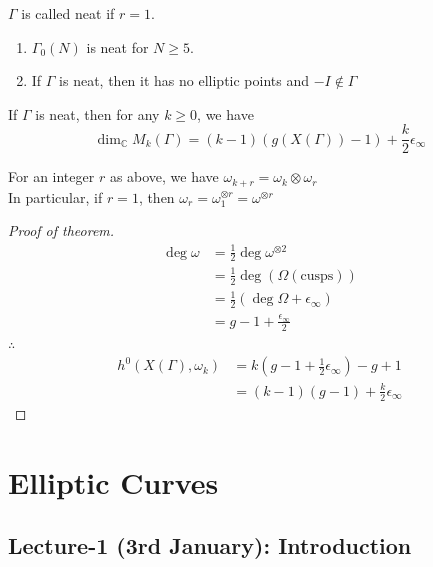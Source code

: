 \documentclass[oneside, 12pt, ]{scrbook}
\newcommand{\CC}{\mathbb C}
\theoremstyle{theorem}
\begin{document}
\begin{definition}
$\Gamma$ is called neat if $r=1$.
\end{definition}

\begin{exercise}
\begin{enumerate}
\item $\Gamma_{0}(N)$ is neat for $N \geq 5$.
\item If $\Gamma$ is neat, then it has no elliptic points and $-I \not \in \Gamma$
\end{enumerate}
\end{exercise}

\begin{theorem}
If $\Gamma$ is neat, then for any $k \geq 0$, we have $$\dim_{\CC} M_{k}(\Gamma) = (k-1)(g(X(\Gamma))-1) + \frac{k}{2} \epsilon_{\infty}$$
\end{theorem}

\begin{remark}[Fact]
For an integer $r$ as above, we have $\omega_{k + r} = \omega_{k} \otimes \omega_{r}$ \\

In particular, if $r=1$, then $\omega_{r} = \omega_{1}^{\otimes r}  = \omega^{\otimes r}$
\end{remark}

\begin{proof}[Proof of theorem]
\begin{align*}
\deg \omega &= \frac{1}{2} \deg \omega^{\otimes 2} \\
&= \frac{1}{2} \deg (\Omega(\text{cusps})) \\
&= \frac{1}{2} (\deg \Omega + \epsilon_{\infty}) \\
&= g-1 + \frac{\epsilon_{\infty}}{2}
\end{align*}
$\therefore$
\begin{align*}
h^{0}(X(\Gamma), \omega_{k}) &= k(g-1 + \frac{1}{2} \epsilon_{\infty}) - g + 1 \\
&= (k-1)(g-1) + \frac{k}{2} \epsilon_{\infty}
\end{align*}
\end{proof}



\part{Elliptic Curves}

\chapter{Lecture-1 (3rd January): Introduction }
\end{document}
